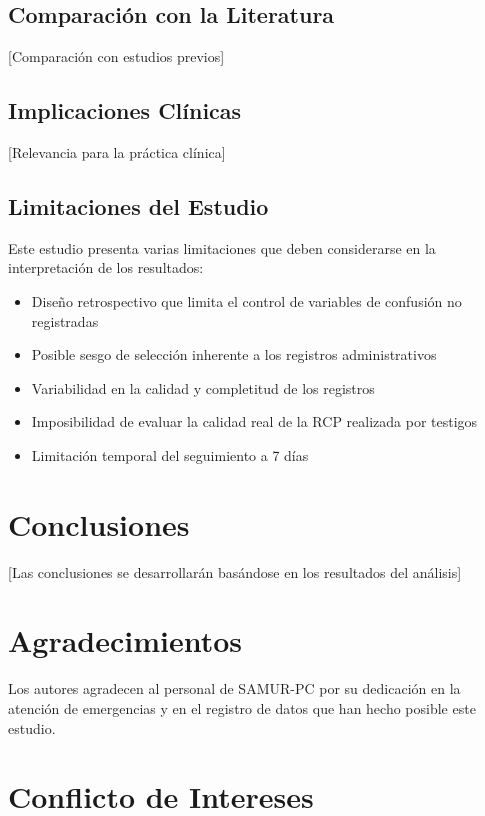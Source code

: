 \documentclass[10pt,a4paper]{article}
\begin{document}
\begin{multicols}{2}
\subsection{Comparación con la Literatura}

[Comparación con estudios previos]

\subsection{Implicaciones Clínicas}

[Relevancia para la práctica clínica]

\subsection{Limitaciones del Estudio}

Este estudio presenta varias limitaciones que deben considerarse en la interpretación de los resultados:

\begin{itemize}
\item Diseño retrospectivo que limita el control de variables de confusión no registradas
\item Posible sesgo de selección inherente a los registros administrativos
\item Variabilidad en la calidad y completitud de los registros
\item Imposibilidad de evaluar la calidad real de la RCP realizada por testigos
\item Limitación temporal del seguimiento a 7 días
\end{itemize}

\section{Conclusiones}

[Las conclusiones se desarrollarán basándose en los resultados del análisis]

\section{Agradecimientos}

Los autores agradecen al personal de SAMUR-PC por su dedicación en la atención de emergencias y en el registro de datos que han hecho posible este estudio.

\section{Conflicto de Intereses}


\end{multicols}
\end{document}
